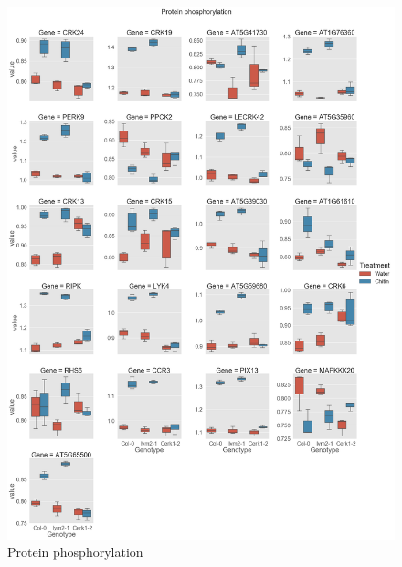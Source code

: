 \documentclass[../main.tex]{subfiles}
\begin{document}
\begin{figure}[ht]
  \centering
  \includegraphics[width=\textwidth, height=\textheight, keepaspectratio]{figures/protein phosphorylation.png}
  \caption{\label{fig:phosphorylation} Protein phosphorylation}
\end{figure}
\end{document}
